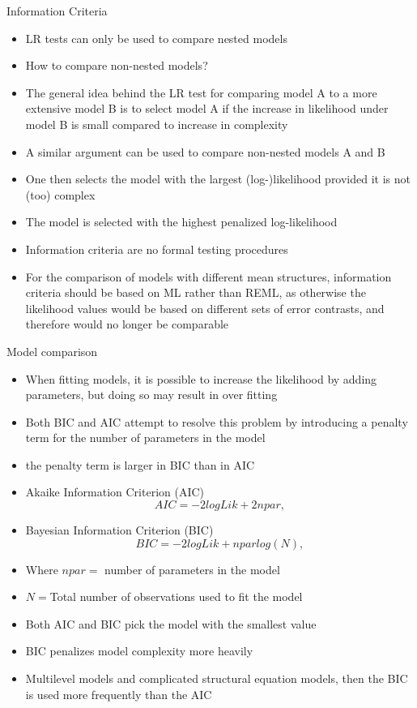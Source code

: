 \documentclass{beamer}
\begin{document}
\begin{frame}{Information Criteria}
\begin{itemize}
	\item LR tests can only be used to compare nested models
	\item How to compare non-nested models?
	\item The general idea behind the LR test for comparing model A to a more extensive model B is to select model A if the increase in likelihood under model B is small compared to increase in complexity
	\item A similar argument can be used to compare non-nested models A and B
	\item One then selects the model with the largest (log-)likelihood provided it is not (too) complex
	\item The model is selected with the highest penalized log-likelihood 
	\item Information criteria are no formal testing procedures
	\item For the comparison of models with different mean structures, information criteria should be based on ML rather than REML, as otherwise the likelihood values would be based on different sets of error contrasts, and therefore would no longer be comparable
\end{itemize}
\end{frame}

\begin{frame}{Model comparison}
\begin{itemize}
	\item When fitting models, it is possible to increase the likelihood by adding parameters, but doing so may result in over fitting
	\item Both BIC and AIC attempt to resolve this problem by introducing a penalty term for the number of parameters in the model
	\item  the penalty term is larger in BIC than in AIC
	\item Akaike Information Criterion (AIC)
	\[AIC = -2 log Lik + 2npar ,
	\]
	\item Bayesian Information Criterion (BIC)
	\[BIC = -2 log Lik + npar log(N),
	\]
	\item Where $npar=$ number of parameters in the model
	\item $N=$Total number of observations used to fit the model
	\item Both AIC and BIC pick the model with the smallest value
	\item BIC penalizes model complexity more heavily
	\item Multilevel models and complicated structural equation models, then the BIC is used more frequently than the AIC 	
\end{itemize}
\end{frame}
\end{document}
